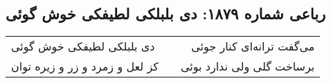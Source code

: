 \begin{center}
\section*{رباعی شماره ۱۸۷۹: دی بلبلکی لطیفکی خوش گوئی}
\label{sec:1879}
\begin{longtable}{l p{0.5cm} r}
دی بلبلکی لطیفکی خوش گوئی
&&
می‌گفت ترانه‌ای کنار جوئی
\\
کز لعل و زمرد و زر و زیره توان
&&
برساخت گلی ولی ندارد بوئی
\\
\end{longtable}
\end{center}
